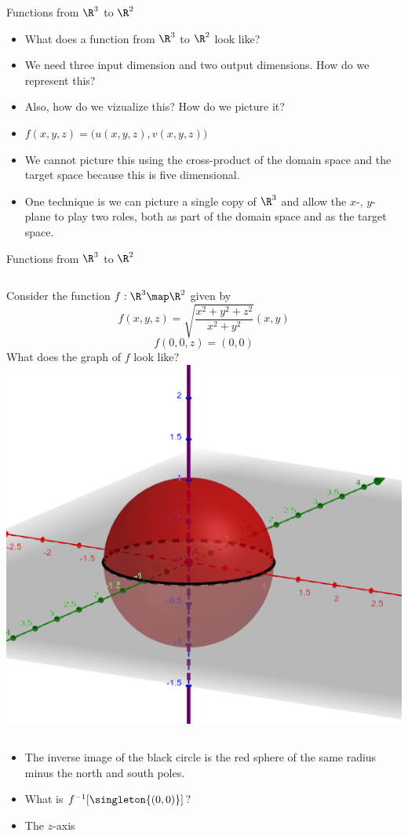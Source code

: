 \documentclass{beamer}
\begin{document}
\begin{frame}{Functions from $\R^3$ to $\R^2$}

\begin{itemize}
\item What does a function from $\R^3$ to $\R^2$ look like?
\item We need three input dimension and two output dimensions.
How do we represent this?
\item Also, how do we vizualize this? How do we picture it?
\item $f(x,y,z) = \big( u(x,y,z), v(x,y,z) \big)$
\item We cannot picture this using the cross-product of the domain space
and the target space because this is five dimensional.
\item One technique is we can picture a single copy of $\R^3$ and allow the
$x$-, $y$- plane to play two roles, both as part of the domain space and as
the target space.
\end{itemize}
\end{frame}

\begin{frame}{Functions from $\R^3$ to $\R^2$}

\begin{columns}
\column[T]{5cm}
Consider the function $f:\R^3\map\R^2$ given by
$$f(x,y, z) = \sqrt{\frac{x^2 + y^2 + z^2}{x^2+y^2}}(x, y)$$
$$f(0,0, z) = (0,0)$$
What does the graph of $f$ look like?
\column[T]{5cm}
\includegraphics[scale=0.25]{sphere2}
\end{columns}

\begin{itemize}
\item The inverse image of the black circle is the red sphere of the same radius
minus the north and south poles.
\item What is $f^{-1}[\singleton{(0,0)}]$?
\item The $z$-axis
\end{itemize}
\end{frame}
\end{document}
